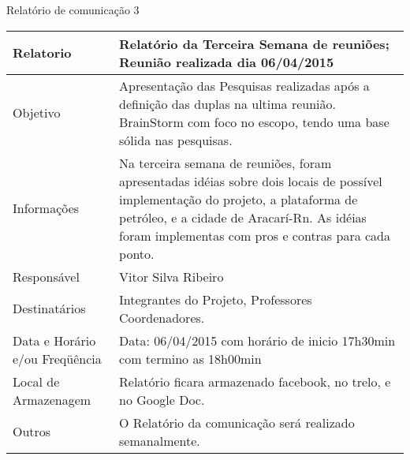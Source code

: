 \documentclass[12pt,openright,oneside,a4paper,brazil]{abntex2}
\begin{document}
\begin{center}
{\large Relatório de comunicação 3}
\begin{table}[h]
\begin{tabular}{|p{6cm}|p{9cm}|}\hline
Relatorio & Relatório da Terceira Semana de reuniões; Reunião realizada dia 06/04/2015\\ \hline
Objetivo & Apresentação das Pesquisas realizadas após a definição das duplas na ultima reunião. BrainStorm com foco  no escopo, tendo uma base sólida nas pesquisas.\\ \hline
Informações & Na terceira semana de reuniões, foram apresentadas idéias sobre dois locais de possível implementação do projeto, a plataforma de petróleo, e a cidade de Aracarí-Rn. As idéias foram implementas com pros e contras para cada ponto.\\ \hline
Responsável & Vitor Silva Ribeiro\\ \hline
Destinatários & Integrantes do Projeto, Professores Coordenadores.\\ \hline
Data e Horário e/ou Freqüência &Data: 06/04/2015 com horário de inicio 17h30min com termino as 18h00min\\ \hline
Local de Armazenagem & Relatório ficara armazenado facebook, no trelo, e no Google Doc.\\ \hline
Outros & O Relatório da comunicação será realizado semanalmente.\\ \hline
\end{tabular}
\end{table}


\end{center}
\end{document}

